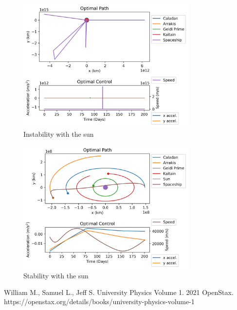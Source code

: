 \documentclass[11pt]{amsart}
\begin{document}
\begin{figure}[htp]
    \centering
    \includegraphics[width=0.8\textwidth]{instability_sun.png}\hfill
    \caption{Instability with the sun}
    \label{fig:fixed_time_sun_bad}
\end{figure}

\begin{figure}[htp]
    \centering
    \includegraphics[width=0.8\textwidth]{f3.png}\hfill
    \caption{Stability with the sun}
    \label{fig:fixed_time_sun_good}
\end{figure}







\FloatBarrier %
\newpage


\begin{thebibliography}{99}
 William M., Samuel L., Jeff S. University Physics Volume 1. 2021 OpenStax. https://openstax.org/details/books/university-physics-volume-1 

\end{thebibliography}
\end{document}

